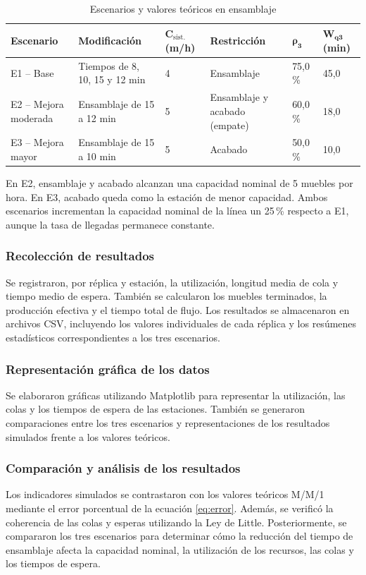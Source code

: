 \documentclass[conference,a4paper]{IEEEtran}
\newcommand{\tablabase}{\renewcommand{\arraystretch}{1.1}\setlength{\tabcolsep}{2.5pt}}
\begin{document}
\begin{table}[!t]
\caption{Escenarios y valores teóricos en ensamblaje}
\label{tab:escenarios}
\centering
\scriptsize
\tablabase
\begin{tabular}{|L{1.35cm}|L{2.0cm}|C{0.95cm}|L{1.45cm}|C{0.85cm}|C{0.95cm}|}
\hline
\textbf{Escenario} & \textbf{Modificación} & $\boldsymbol{C_{\mathrm{sist.}}}$ (m/h) &
\textbf{Restricción} & $\boldsymbol{\rho_3}$ & $\boldsymbol{W_{q3}}$ (min) \\ \hline
E1 -- Base & Tiempos de 8, 10, 15 y 12 min & 4 & Ensamblaje & 75,0\,\% & 45,0 \\ \hline
E2 -- Mejora moderada & Ensamblaje de 15 a 12 min & 5 & Ensamblaje y acabado (empate) &
60,0\,\% & 18,0 \\ \hline
E3 -- Mejora mayor & Ensamblaje de 15 a 10 min & 5 & Acabado & 50,0\,\% & 10,0 \\ \hline
\end{tabular}
\end{table}

En E2, ensamblaje y acabado alcanzan una capacidad nominal de 5 muebles por hora. En E3,
acabado queda como la estación de menor capacidad. Ambos escenarios incrementan la capacidad
nominal de la línea un 25\,\% respecto a E1, aunque la tasa de llegadas permanece constante.

\subsubsection{Recolección de resultados}
Se registraron, por réplica y estación, la utilización, longitud media de cola y tiempo medio
de espera. También se calcularon los muebles terminados, la producción efectiva y el tiempo
total de flujo. Los resultados se almacenaron en archivos CSV, incluyendo los valores
individuales de cada réplica y los resúmenes estadísticos correspondientes a los tres
escenarios.

\subsubsection{Representación gráfica de los datos}
Se elaboraron gráficas utilizando Matplotlib para representar la utilización, las colas y los
tiempos de espera de las estaciones. También se generaron comparaciones entre los tres
escenarios y representaciones de los resultados simulados frente a los valores teóricos.

\subsubsection{Comparación y análisis de los resultados}
Los indicadores simulados se contrastaron con los valores teóricos M/M/1 mediante el error
porcentual de la ecuación \eqref{eq:error}. Además, se verificó la coherencia de las colas y
esperas utilizando la Ley de Little. Posteriormente, se compararon los tres escenarios para
determinar cómo la reducción del tiempo de ensamblaje afecta la capacidad nominal, la
utilización de los recursos, las colas y los tiempos de espera.
\end{document}
